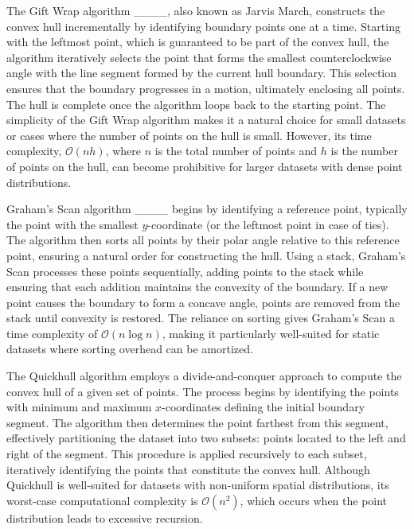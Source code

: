 The Gift Wrap algorithm ____, also known as Jarvis March, constructs the convex hull incrementally by identifying boundary points one at a time. Starting with the leftmost point, which is guaranteed to be part of the convex hull, the algorithm iteratively selects the point that forms the smallest counterclockwise angle with the line segment formed by the current hull boundary. This selection ensures that the boundary progresses in a  motion, ultimately enclosing all points. The hull is complete once the algorithm loops back to the starting point. The simplicity of the Gift Wrap algorithm makes it a natural choice for small datasets or cases where the number of points on the hull is small. However, its time complexity, \(\mathcal{O}(nh)\), where \(n\) is the total number of points and \(h\) is the number of points on the hull, can become prohibitive for larger datasets with dense point distributions.

Graham’s Scan algorithm ____ begins by identifying a reference point, typically the point with the smallest \(y\)-coordinate (or the leftmost point in case of ties). The algorithm then sorts all points by their polar angle relative to this reference point, ensuring a natural order for constructing the hull. Using a stack, Graham’s Scan processes these points sequentially, adding points to the stack while ensuring that each addition maintains the convexity of the boundary. If a new point causes the boundary to form a concave angle, points are removed from the stack until convexity is restored. The reliance on sorting gives Graham’s Scan a time complexity of \(\mathcal{O}(n \log n)\), making it particularly well-suited for static datasets where sorting overhead can be amortized.



The Quickhull algorithm employs a divide-and-conquer approach to compute the convex hull of a given set of points. The process begins by identifying the points with minimum and maximum \(x\)-coordinates defining the initial boundary segment. The algorithm then determines the point farthest from this segment, effectively partitioning the dataset into two subsets: points located to the left and right of the segment. This procedure is applied recursively to each subset, iteratively identifying the points that constitute the convex hull. Although Quickhull is well-suited for datasets with non-uniform spatial distributions, its worst-case computational complexity is \(\mathcal{O}(n^2)\), which occurs when the point distribution leads to excessive recursion.



